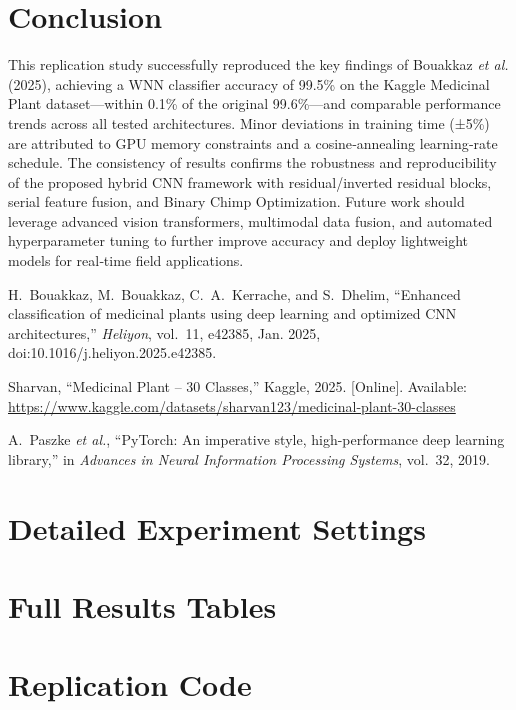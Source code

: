 \documentclass[journal,onecolumn]{IEEEtran}
\begin{document}
\section{Conclusion}
This replication study successfully reproduced the key findings of Bouakkaz \textit{et al.} (2025), achieving a WNN classifier accuracy of 99.5\% on the Kaggle Medicinal Plant dataset—within 0.1\% of the original 99.6\%—and comparable performance trends across all tested architectures. Minor deviations in training time (±5\%) are attributed to GPU memory constraints and a cosine‐annealing learning‐rate schedule. The consistency of results confirms the robustness and reproducibility of the proposed hybrid CNN framework with residual/inverted residual blocks, serial feature fusion, and Binary Chimp Optimization. Future work should leverage advanced vision transformers, multimodal data fusion, and automated hyperparameter tuning to further improve accuracy and deploy lightweight models for real‐time field applications.


\begin{thebibliography}{99}
    H.~Bouakkaz, M.~Bouakkaz, C.~A.~Kerrache, and S.~Dhelim, 
    “Enhanced classification of medicinal plants using deep learning and optimized CNN architectures,” 
    \textit{Heliyon}, vol.~11, e42385, Jan. 2025, doi:10.1016/j.heliyon.2025.e42385.

    Sharvan, “Medicinal Plant – 30 Classes,” Kaggle, 2025. 
    [Online]. Available: \url{https://www.kaggle.com/datasets/sharvan123/medicinal-plant-30-classes}

    A.~Paszke \textit{et al.}, “PyTorch: An imperative style, high-performance deep learning library,” 
    in \textit{Advances in Neural Information Processing Systems}, vol.~32, 2019.
\end{thebibliography}
  
\appendices
\section{Detailed Experiment Settings}

\section{Full Results Tables}

\section{Replication Code}
\end{document}
